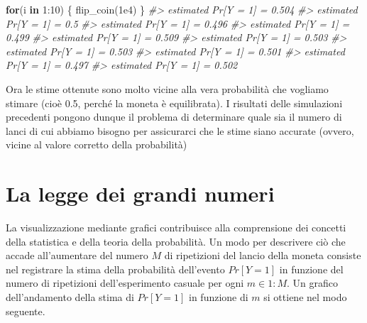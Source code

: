 \documentclass[
  10pt,
  italian,
  a4paper,
  extrafontsizes,onecolumn,openright
  ]{memoir}
\newenvironment{Shaded}{\begin{snugshade}}{\end{snugshade}}
\newcommand{\CommentTok}[1]{\textcolor[rgb]{0.56,0.35,0.01}{\textit{#1}}}
\newcommand{\ControlFlowTok}[1]{\textcolor[rgb]{0.13,0.29,0.53}{\textbf{#1}}}
\newcommand{\DecValTok}[1]{\textcolor[rgb]{0.00,0.00,0.81}{#1}}
\newcommand{\FloatTok}[1]{\textcolor[rgb]{0.00,0.00,0.81}{#1}}
\newcommand{\FunctionTok}[1]{\textcolor[rgb]{0.00,0.00,0.00}{#1}}
\newcommand{\NormalTok}[1]{#1}
\newcommand{\SpecialCharTok}[1]{\textcolor[rgb]{0.00,0.00,0.00}{#1}}
\theoremstyle{definition}
\theoremstyle{definition}
\theoremstyle{definition}
\theoremstyle{definition}
\theoremstyle{remark}
\begin{document}
\begin{Shaded}
\begin{Highlighting}[]
\ControlFlowTok{for}\NormalTok{(i }\ControlFlowTok{in} \DecValTok{1}\SpecialCharTok{:}\DecValTok{10}\NormalTok{) \{}
  \FunctionTok{flip\_coin}\NormalTok{(}\FloatTok{1e4}\NormalTok{)}
\NormalTok{\}}
\CommentTok{\#\textgreater{} estimated Pr[Y = 1] = 0.504 }
\CommentTok{\#\textgreater{} estimated Pr[Y = 1] = 0.5 }
\CommentTok{\#\textgreater{} estimated Pr[Y = 1] = 0.496 }
\CommentTok{\#\textgreater{} estimated Pr[Y = 1] = 0.499 }
\CommentTok{\#\textgreater{} estimated Pr[Y = 1] = 0.509 }
\CommentTok{\#\textgreater{} estimated Pr[Y = 1] = 0.503 }
\CommentTok{\#\textgreater{} estimated Pr[Y = 1] = 0.503 }
\CommentTok{\#\textgreater{} estimated Pr[Y = 1] = 0.501 }
\CommentTok{\#\textgreater{} estimated Pr[Y = 1] = 0.497 }
\CommentTok{\#\textgreater{} estimated Pr[Y = 1] = 0.502}
\end{Highlighting}
\end{Shaded}

\noindent
Ora le stime ottenute sono molto vicine alla vera probabilità che vogliamo stimare (cioè 0.5, perché la moneta è equilibrata). I risultati delle simulazioni precedenti pongono dunque il problema di determinare quale sia il numero di lanci di cui abbiamo bisogno per assicurarci che le stime siano accurate (ovvero, vicine al valore corretto della probabilità)

\hypertarget{la-legge-dei-grandi-numeri}{%
\section{La legge dei grandi numeri}\label{la-legge-dei-grandi-numeri}}

La visualizzazione mediante grafici contribuisce alla comprensione dei concetti della statistica e della teoria della probabilità. Un modo per descrivere ciò che accade all'aumentare del numero \(M\) di ripetizioni del lancio della moneta consiste nel registrare la stima della probabilità dell'evento \(Pr[Y = 1]\) in funzione del numero di ripetizioni dell'esperimento casuale per ogni \(m \in 1 : M.\) Un grafico dell'andamento della stima di \(Pr[Y = 1]\) in funzione di \(m\) si ottiene nel modo seguente.
\end{document}
